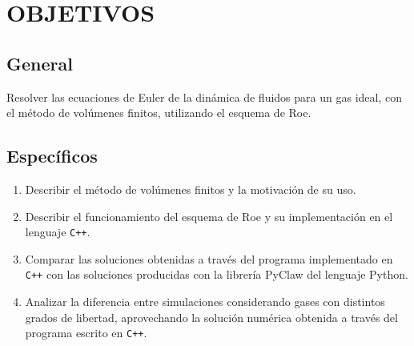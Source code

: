 \chapter{OBJETIVOS}

\section*{General}
Resolver las ecuaciones de Euler de la dinámica de fluidos para un gas ideal, con el método de volúmenes finitos, utilizando el esquema de Roe.


\section*{Específicos}

\begin{enumerate}
	\item Describir el método de volúmenes finitos y la motivación de su uso. 
	\item Describir el funcionamiento del esquema de Roe y su implementación en el lenguaje \texttt{C++}.
	\item Comparar las soluciones obtenidas a través del programa implementado en \texttt{C++} con las soluciones producidas con la librería PyClaw del lenguaje Python.
	\item Analizar la diferencia entre simulaciones considerando gases con distintos grados de libertad, aprovechando la solución numérica obtenida a través del programa escrito en \texttt{C++}.
\end{enumerate}

